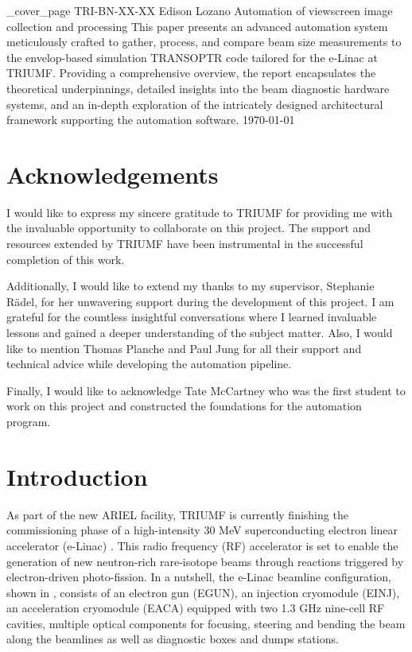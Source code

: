 \documentclass{article}
\newcommand{\ttmdump}[1]{#1}
\begin{document}
    \ttmdump{\make_cover_page
        {TRI-BN-XX-XX} 
        {Edison Lozano} 
        {Automation of viewscreen image collection and processing}
        {This paper presents an advanced automation system meticulously crafted to gather, process, and compare beam size measurements to the envelop-based simulation TRANSOPTR code tailored for the e-Linac at TRIUMF. Providing a comprehensive overview, the report encapsulates the theoretical underpinnings, detailed insights into the beam diagnostic hardware systems, and an in-depth exploration of the intricately designed architectural framework supporting the automation software.}
        {\today}}


\newpage
\section*{Acknowledgements}
\thispagestyle{empty}

 I would like to express my sincere gratitude to TRIUMF for providing me with the invaluable opportunity to collaborate on this project. The support and resources extended by TRIUMF have been instrumental in the successful completion of this work.

 Additionally, I would like to extend my thanks to my supervisor, Stephanie Rädel, for her unwavering support during the development of this project. I am grateful for the countless insightful conversations where I learned invaluable lessons and gained a deeper understanding of the subject matter. Also, I would like to mention Thomas Planche and Paul Jung for all their support and technical advice while developing the automation pipeline.
 
 Finally, I would like to acknowledge Tate McCartney who was the first student to work on this project and constructed the foundations for the automation program.
\newpage
\tableofcontents
\newpage

\section{Introduction}

As part of the new ARIEL facility, TRIUMF is currently finishing the commissioning phase of a high-intensity 30 MeV superconducting electron linear accelerator (e-Linac) \cite{koscielniak2012ariel}. This radio frequency (RF) accelerator is set to enable the generation of new neutron-rich rare-isotope beams through reactions triggered by electron-driven photo-fission. In a nutshell, the e-Linac beamline configuration, shown in , consists of an electron gun (EGUN), an injection cryomodule (EINJ), an acceleration cryomodule (EACA) equipped with two 1.3 GHz nine-cell RF cavities, multiple optical components for focusing, steering and bending the beam along the beamlines as well as diagnostic boxes and dumps stations.
\end{document}
